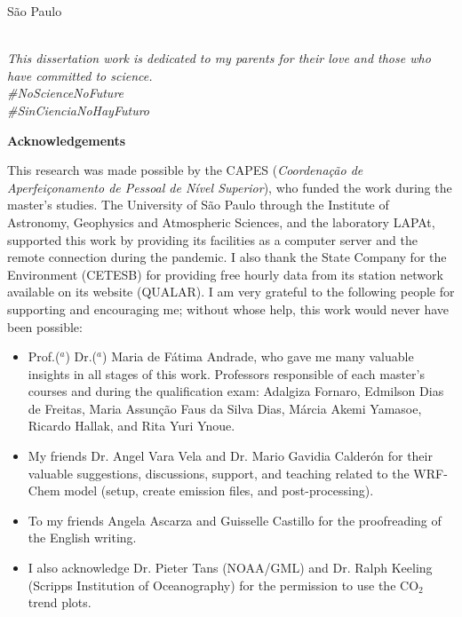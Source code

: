 \begin{spacing}{1.5}
\begin{titlepage}
			\vfill
	\begin{center}
				S\~{a}o Paulo \\
			\the\year \\
	\end{center}
	\end{titlepage}		

	\newpage
	\thispagestyle{empty}
	\vspace*{\fill} \hfill\begin{minipage}{0.5\linewidth}
	\begin{flushright}
	\textit{This dissertation work is dedicated to my parents for their love and those who have committed to science.  \\
	\#NoScienceNoFuture\\
	\#SinCienciaNoHayFuturo \\
	 }
	\end{flushright}
		\end{minipage}
	\pagestyle{empty}
	
	\newpage
		\begin{center}
			\LARGE \textbf{Acknowledgements}\\[2cm]
		\end{center}
		
		This research was made possible by the CAPES (\textit{Coordena\c{c}\~{a}o de Aperfei\c{c}onamento de Pessoal de N\'{i}vel Superior}), who funded the work during the master's studies.
		The University of S\~{a}o Paulo through the Institute of Astronomy, Geophysics and Atmospheric Sciences, and the laboratory LAPAt, supported this work by providing its facilities as a computer server and the remote connection during the pandemic.
		I also thank the State Company for the Environment (CETESB) for providing free hourly data from its station network available on its website (QUALAR).
		I am very grateful to the following people for supporting and encouraging me; without whose help, this work would never have been possible:
		\begin{itemize}
		    \item Prof.($^a$) Dr.($^a$) Maria de F\'{a}tima Andrade, who gave me many valuable insights in all stages of this work.
		    Professors responsible of each master's courses and during the qualification exam: Adalgiza Fornaro, Edmilson Dias de Freitas, Maria Assun\c{c}\~{a}o Faus da Silva Dias, M\'{a}rcia Akemi Yamasoe, Ricardo Hallak, and Rita Yuri Ynoue.
		   \item  My friends Dr. Angel Vara Vela and Dr. Mario Gavidia Calder\'{o}n for their valuable suggestions, discussions, support, and teaching related to the WRF-Chem model (setup, create emission files, and post-processing).
		   \item To my friends Angela Ascarza and Guisselle Castillo for the proofreading of the English writing.
		   \item I also acknowledge Dr. Pieter Tans (NOAA/GML) and Dr. Ralph Keeling (Scripps Institution of Oceanography) for the permission to use the CO$_2$ trend plots.
		\end{itemize}
		

\end{spacing}
